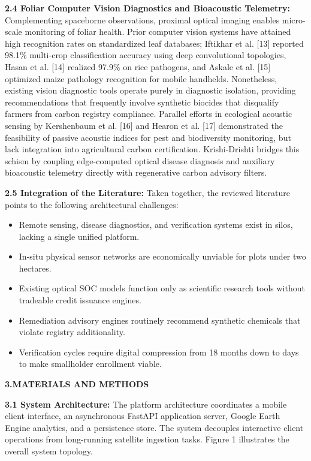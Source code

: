 \documentclass[11pt,a4paper]{article}
\begin{document}
\noindent \textbf{2.4 Foliar Computer Vision Diagnostics and Bioacoustic Telemetry:} 
Complementing spaceborne observations, proximal optical imaging enables micro-scale monitoring of foliar health. Prior computer vision systems have attained high recognition rates on standardized leaf databases; Iftikhar et al. [13] reported 98.1\% multi-crop classification accuracy using deep convolutional topologies, Hasan et al. [14] realized 97.9\% on rice pathogens, and Askale et al. [15] optimized maize pathology recognition for mobile handhelds. Nonetheless, existing vision diagnostic tools operate purely in diagnostic isolation, providing recommendations that frequently involve synthetic biocides that disqualify farmers from carbon registry compliance. Parallel efforts in ecological acoustic sensing by Kershenbaum et al. [16] and Hearon et al. [17] demonstrated the feasibility of passive acoustic indices for pest and biodiversity monitoring, but lack integration into agricultural carbon certification. Krishi-Drishti bridges this schism by coupling edge-computed optical disease diagnosis and auxiliary bioacoustic telemetry directly with regenerative carbon advisory filters.

\noindent \textbf{2.5 Integration of the Literature:} Taken together, the reviewed literature points to the following architectural challenges:
\begin{itemize}[noitemsep,topsep=2pt]
    \item Remote sensing, disease diagnostics, and verification systems exist in silos, lacking a single unified platform.
    \item In-situ physical sensor networks are economically unviable for plots under two hectares.
    \item Existing optical SOC models function only as scientific research tools without tradeable credit issuance engines.
    \item Remediation advisory engines routinely recommend synthetic chemicals that violate registry additionality.
    \item Verification cycles require digital compression from 18 months down to days to make smallholder enrollment viable.
\end{itemize}
\vspace{1.2em}

\noindent \textbf{\large 3.MATERIALS AND METHODS}
\vspace{0.5em}

\noindent \textbf{3.1 System Architecture:} 
The platform architecture coordinates a mobile client interface, an asynchronous FastAPI application server, Google Earth Engine analytics, and a persistence store. The system decouples interactive client operations from long-running satellite ingestion tasks. Figure 1 illustrates the overall system topology.
\end{document}
